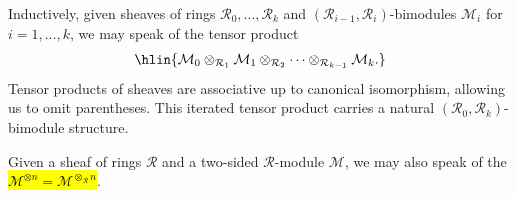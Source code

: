 \begin{definition}
Inductively, given sheaves of rings $\mathcal{R}_0, \ldots, \mathcal{R}_k$ and $(\mathcal{R}_{i-1}, \mathcal{R}_i)$-bimodules $\mathcal{M}_i$ for $i = 1, \ldots, k$, we may speak of the tensor product
$$ \hlin{\mathcal{M}_0 \otimes_{\mathcal{R}_1} \mathcal{M}_1 \otimes_{\mathcal{R}_2} \cdots \otimes_{\mathcal{R}_{k-1}} \mathcal{M}_k. }$$
Tensor products of sheaves are associative up to canonical isomorphism\TODO{}, allowing us to omit parentheses. This iterated tensor product carries a natural $(\mathcal{R}_0, \mathcal{R}_k)$-bimodule structure.


Given a sheaf of rings $\mathcal{R}$ and a two-sided $\mathcal{R}$-module $\mathcal{M}$, we may also speak of the  \hl{$\mathcal{M}^{\otimes n} = \mathcal{M}^{\otimes_{\mathcal{R}} n}$}.
\end{definition}